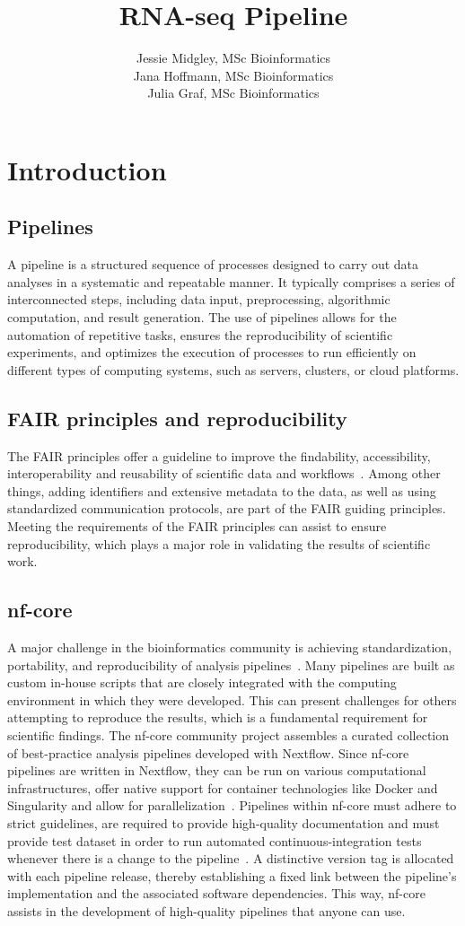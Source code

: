 \documentclass[12pt]{article}
\title{\textbf{RNA-seq Pipeline}}
\author{Jessie Midgley, MSc Bioinformatics
\\ Jana Hoffmann, MSc Bioinformatics
\\ Julia Graf, MSc Bioinformatics}
\begin{document}
\maketitle



\section{Introduction}
\subsection{Pipelines}
A pipeline is a structured sequence of processes designed to carry out data analyses in a systematic and repeatable manner. It typically comprises a series of interconnected steps, including data input, preprocessing, algorithmic computation, and result generation. The use of pipelines allows for the automation of repetitive tasks, ensures the reproducibility of scientific experiments, and optimizes the execution of processes to run efficiently on different types of computing systems, such as servers, clusters, or cloud platforms.
\subsection{FAIR principles and reproducibility}
The FAIR principles offer a guideline to improve the findability, accessibility, interoperability and reusability of scientific data and workflows~\cite{wilkinson2016fair}.
Among other things, adding identifiers and extensive metadata to the data, as well as using standardized communication protocols, are part of the FAIR guiding principles. Meeting the requirements of the FAIR principles can assist to ensure reproducibility, which plays a major role in validating the results of scientific work.
\subsection{nf-core}
A major challenge in the bioinformatics community is achieving standardization, portability, and reproducibility of analysis pipelines~\cite{ewels2020nf}. Many pipelines are built as custom in-house scripts that are closely integrated with the computing environment in which they were developed. This can present challenges for others attempting to reproduce the results, which is a fundamental requirement for scientific findings. The nf-core community project assembles a curated collection of best-practice analysis pipelines developed with Nextflow. Since nf-core pipelines are written in Nextflow, they can be run on various computational infrastructures, offer native support for container technologies like Docker and Singularity and allow for parallelization~\cite{di2017nextflow}. Pipelines within nf-core must adhere to strict guidelines, are required to provide high-quality documentation and must provide test dataset in order to run automated continuous-integration tests whenever there is a change to the pipeline~\cite{ewels2020nf}. A distinctive version tag is allocated with each pipeline release, thereby establishing a fixed link between the pipeline's implementation and the associated software dependencies. This way, nf-core assists in the development of high-quality pipelines that anyone can use.
\end{document}
